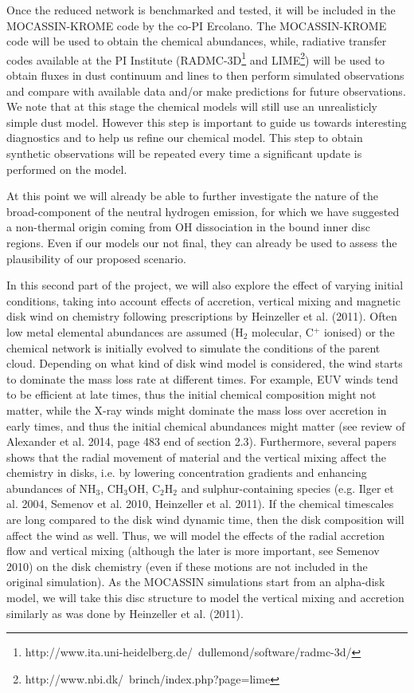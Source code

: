 \documentclass[10pt,fleqn,twoside]{article}
\newcommand{\Tcol}{\color{blue}}
\begin{document}
\noindent {\Tcol\bf Line diagnostics from chemical models.} Once the reduced network is benchmarked and tested, it will be included in the MOCASSIN-KROME code by the co-PI Ercolano. The MOCASSIN-KROME code will be used to obtain the chemical abundances, while, radiative transfer codes available at the PI Institute (RADMC-3D\footnote{http://www.ita.uni-heidelberg.de/~dullemond/software/radmc-3d/} and LIME\footnote{http://www.nbi.dk/~brinch/index.php?page=lime}) will be used to obtain fluxes in dust continuum and lines to then perform simulated observations and compare with available data and/or make predictions for future observations. We note that at this stage the chemical models will still use an unrealisticly simple dust model. However this step is important to guide us towards interesting diagnostics and to help us refine our chemical model. This step to obtain synthetic observations will be repeated every time a significant update is performed on the model. 

At this point we will already be able to further investigate the nature of the broad-component of the neutral hydrogen emission, for which we have suggested a non-thermal origin coming from OH dissociation in the bound inner disc regions. Even if our models our not final, they can already be used to assess the plausibility of our proposed scenario.

In this second part of the project, we will also explore the effect of
varying initial conditions, taking into account effects of accretion,
vertical mixing and magnetic disk wind on chemistry following
prescriptions by Heinzeller et al. (2011). Often low metal elemental
abundances are assumed (H$_2$ molecular, C$^+$ ionised) or the
chemical network is initially evolved to simulate the conditions of
the parent cloud.  Depending on what kind of disk wind model is
considered, the wind starts to dominate the mass loss rate at
different times. For example, EUV winds tend to be efficient at late
times, thus the initial chemical composition might not matter, while
the X-ray winds might dominate the mass loss over accretion in early
times, and thus the initial chemical abundances might matter (see
review of Alexander et al. 2014, page 483 end of section
2.3). Furthermore, several papers shows that the radial movement of
material and the vertical mixing affect the chemistry in disks,
i.e. by lowering concentration gradients and enhancing abundances of
NH$_3$, CH$_3$OH, C$_2$H$_2$ and sulphur-containing species
(e.g. Ilger et al. 2004, Semenov et al. 2010, Heinzeller et
al. 2011). If the chemical timescales are long compared to the disk
wind dynamic time, then the disk composition will affect the wind as
well. Thus, we will model the effects of the radial accretion flow and
vertical mixing (although the later is more important, see Semenov
2010) on the disk chemistry (even if these motions are not included in
the original simulation). As the MOCASSIN simulations start from an
alpha-disk model, we will take this disc structure to model the
vertical mixing and accretion similarly as was done by Heinzeller et
al. (2011). 
\end{document}
